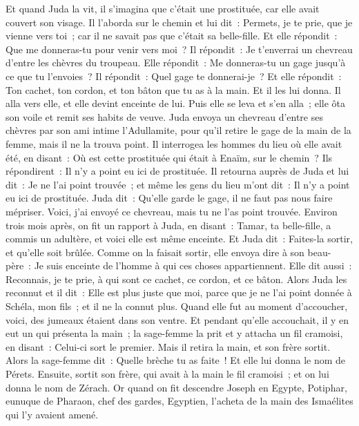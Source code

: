 \begin{multicols}{2}
Et quand Juda la vit, il s'imagina que c'était une prostituée, car elle avait couvert son visage.
Il l'aborda sur le chemin et lui dit~: Permets, je te prie, que je vienne vers toi~; car il ne savait pas que c'était sa belle-fille. Et elle répondit~: Que me donneras-tu pour venir vers moi~?
Il répondit~: Je t'enverrai un chevreau d'entre les chèvres du troupeau. Elle répondit~: Me donneras-tu un gage jusqu'à ce que tu l'envoies~?
Il répondit~: Quel gage te donnerai-je~? Et elle répondit~: Ton cachet, ton cordon, et ton bâton que tu as à la main. Et il les lui donna. Il alla vers elle, et elle devint enceinte de lui.
Puis elle se leva et s'en alla~; elle ôta son voile et remit ses habits de veuve.
Juda envoya un chevreau d'entre ses chèvres par son ami intime l'Adullamite, pour qu'il retire le gage de la main de la femme, mais il ne la trouva point.
Il interrogea les hommes du lieu où elle avait été, en disant~: Où est cette prostituée qui était à Enaïm, sur le chemin~? Ils répondirent~: Il n'y a point eu ici de prostituée.
Il retourna auprès de Juda et lui dit~: Je ne l'ai point trouvée~; et même les gens du lieu m'ont dit~: Il n'y a point eu ici de prostituée.
Juda dit~: Qu'elle garde le gage, il ne faut pas nous faire mépriser. Voici, j'ai envoyé ce chevreau, mais tu ne l'as point trouvée.
Environ trois mois après, on fit un rapport à Juda, en disant~: Tamar, ta belle-fille, a commis un adultère, et voici elle est même enceinte. Et Juda dit~: Faites-la sortir, et qu'elle soit brûlée.
Comme on la faisait sortir, elle envoya dire à son beau-père~: Je suis enceinte de l'homme à qui ces choses appartiennent. Elle dit aussi~: Reconnais, je te prie, à qui sont ce cachet, ce cordon, et ce bâton.
Alors Juda les reconnut et il dit~: Elle est plus juste que moi, parce que je ne l'ai point donnée à Schéla, mon fils~; et il ne la connut plus.
Quand elle fut au moment d'accoucher, voici, des jumeaux étaient dans son ventre.
Et pendant qu'elle accouchait, il y en eut un qui présenta la main~; la sage-femme la prit et y attacha un fil cramoisi, en disant~: Celui-ci sort le premier.
Mais il retira la main, et son frère sortit. Alors la sage-femme dit~: Quelle brèche tu as faite~! Et elle lui donna le nom de Pérets.
Ensuite, sortit son frère, qui avait à la main le fil cramoisi~; et on lui donna le nom de Zérach.
\VerseOne{}Or quand on fit descendre Joseph en Egypte, Potiphar, eunuque de Pharaon, chef des gardes, Egyptien, l'acheta de la main des Ismaélites qui l'y avaient amené.

\end{multicols}

